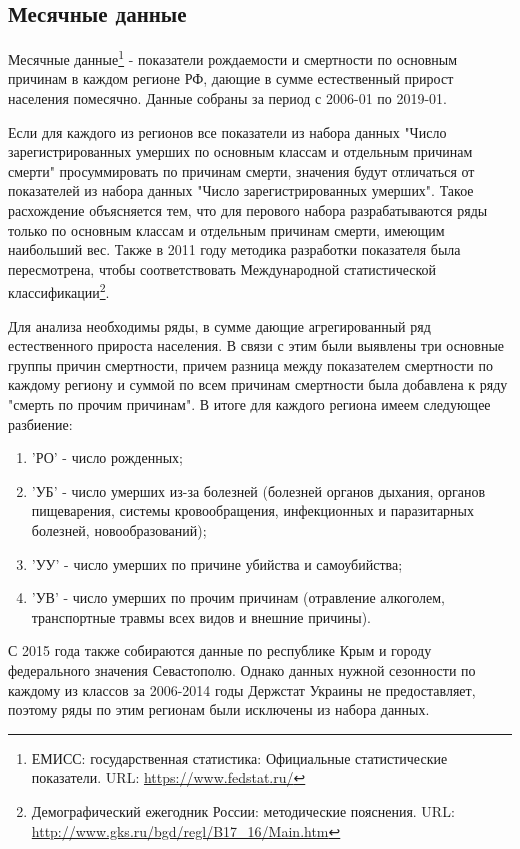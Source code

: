 \documentclass[12pt,a4paper, oneside]{extreport}
\begin{document}
\subsection{Месячные данные}

Месячные данные\footnote{ЕМИСС: государственная статистика: Официальные статистические показатели. URL: \url{https://www.fedstat.ru/}} - показатели рождаемости и смертности по основным причинам  в каждом регионе РФ, дающие в сумме естественный прирост населения помесячно. 
Данные собраны за период с 2006-01 по 2019-01. 


Если для каждого из регионов все показатели из набора данных "Число зарегистрированных умерших по основным классам и отдельным причинам смерти" просуммировать по причинам смерти, значения будут отличаться от показателей  из набора данных "Число зарегистрированных умерших". Такое расхождение объясняется тем, что для перового набора  разрабатываются ряды только по   основным классам и отдельным причинам смерти, имеющим наибольший вес. Также в 2011 году методика разработки показателя была пересмотрена, чтобы соответствовать  Международной статистической классификации\footnote{Демографический ежегодник России: методические пояснения. URL: \url{http://www.gks.ru/bgd/regl/B17\_16/Main.htm}}. 

Для анализа необходимы ряды, в сумме дающие агрегированный ряд естественного прироста населения.  В связи с этим  были выявлены три основные группы причин смертности, причем разница между показателем смертности по каждому региону и суммой по всем причинам смертности была добавлена к ряду "смерть по прочим причинам". В итоге для каждого региона имеем следующее разбиение:   



\begin{enumerate}
	\item 'РО'  -  число рожденных;
	\item  'УБ' - число умерших  из-за болезней (болезней органов дыхания, органов пищеварения, системы кровообращения, инфекционных и паразитарных болезней, новообразований);
\item 'УУ'  -  число умерших по причине убийства и самоубийства;
\item 'УВ'  -  число умерших по прочим причинам (отравление алкоголем, транспортные травмы всех видов и внешние причины).

\end{enumerate}


С 2015 года также собираются данные по республике Крым и городу федерального значения Севастополю. Однако данных нужной сезонности по каждому из классов за 2006-2014 годы Держстат Украины не предоставляет, поэтому ряды по этим регионам были исключены из набора данных. 
\end{document}
